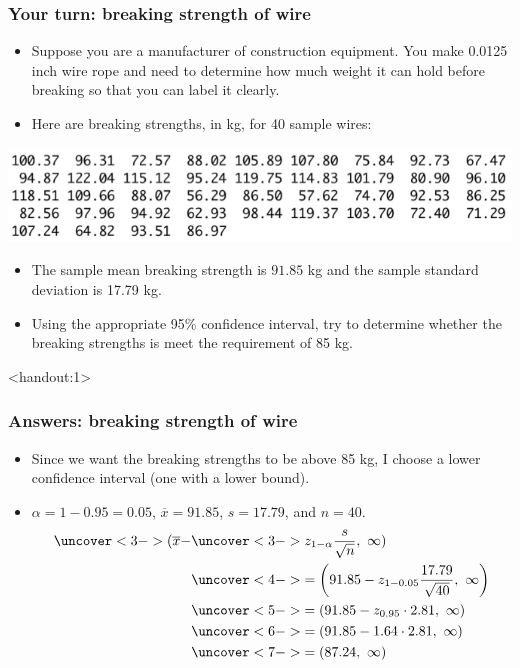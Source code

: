 \documentclass[handout]{beamer}\usepackage{graphicx, color}
\newcommand{\answers}{1}
\providecommand{\ov}[1]{\overline{#1}}
\numberwithin{equation}{section}
\begin{document}
\begin{frame}
\frametitle{Your turn: breaking strength of wire}
\begin{itemize}
\item Suppose you are a manufacturer of construction equipment. You make 0.0125 inch wire rope and need to determine how much weight it can hold before breaking so that you can label it clearly.
\pause \item Here are breaking strengths, in kg, for 40 sample wires:
\end{itemize}
 \includegraphics{../../fig/wiredata.png}
\begin{itemize}
\pause \item The sample mean breaking strength is $91.85$ kg and the sample standard deviation is 17.79 kg. 
\pause \item Using the appropriate 95\% confidence interval, try to determine whether the breaking strengths is meet the requirement of 85 kg.
\end{itemize}
\end{frame}

\begin{frame}<handout:\answers>
\frametitle{Answers: breaking strength of wire} \small
\begin{itemize}
\item Since we want the breaking strengths to be above 85 kg, I choose a lower confidence interval (one with a lower bound).
\pause \item $\alpha = 1 -0.95 = 0.05$, $\ov{x} = 91.85$, $s = 17.79$, and $n = 40$.
\begin{align*}
\uncover<3->{(\ov{x} -}&\uncover<3->{ z_{1 - \alpha} \frac{s}{\sqrt{n}}, \ \infty)} \\
&\uncover<4->{= \left (91.85 - z_{1 - 0.05} \frac{17.79}{\sqrt{40}}, \ \infty \right)} \\
&\uncover<5->{= (91.85 - z_{0.95} \cdot 2.81, \ \infty)} \\
&\uncover<6->{= (91.85 - 1.64 \cdot 2.81, \ \infty)} \\
&\uncover<7->{= (87.24, \ \infty)}
\end{align*}
\end{itemize}
\end{frame}
\end{document}
